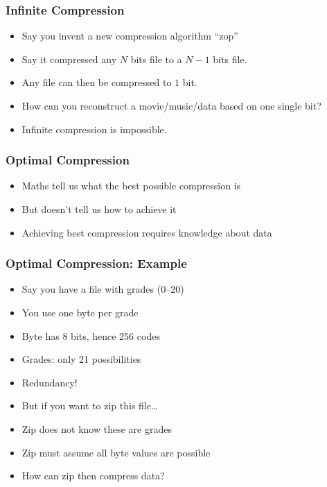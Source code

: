 \documentclass{../ucll-slides}
\begin{document}
\begin{frame}
  \frametitle{Infinite Compression}
  \begin{itemize}
    \item Say you invent a new compression algorithm ``zop''
    \item Say it compressed any $N$ bits file to a $N-1$ bits file.
    \item Any file can then be compressed to $1$ bit.
    \item How can you reconstruct a movie/music/data based on one single bit?
  \end{itemize}
  \begin{center}
  \end{center}
  \begin{itemize}
    \item Infinite compression is impossible.
  \end{itemize}
\end{frame}

\begin{frame}
  \frametitle{Optimal Compression}
  \begin{itemize}
    \item Maths tell us what the best possible compression is
    \item But doesn't tell us how to achieve it
    \item Achieving best compression requires knowledge about data
  \end{itemize}
\end{frame}

\begin{frame}
  \frametitle{Optimal Compression: Example}
  \begin{itemize}
    \item Say you have a file with grades (0--20)
    \item You use one byte per grade
    \item Byte has 8 bits, hence 256 codes
    \item Grades: only 21 possibilities
    \item Redundancy!
    \item But if you want to zip this file\dots
    \item Zip does not know these are grades
    \item Zip must assume all byte values are possible
    \item How can zip then compress data?
  \end{itemize}
\end{frame}
\end{document}
